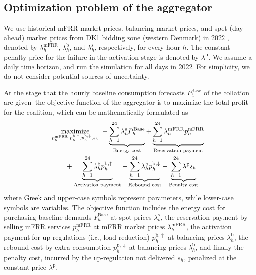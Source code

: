 \documentclass[conference]{IEEEtran}
\begin{document}
\subsection{Optimization problem of the aggregator}
We use historical mFRR market prices, balancing market prices, and spot (day-ahead) market prices from DK1 bidding zone (western Denmark) in 2022 \cite{energinet:energidataservice}, denoted by $\lambda_{h}^{\text{mFRR}}$, $\lambda_{h}^{\text{b}}$, and $\lambda_{h}^{\text{s}}$, respectively,  for every hour $h$. The constant penalty price for the failure in the activation stage is denoted by $\lambda^{\text{p}}$. We assume a daily time horizon, and run the simulation for all days in 2022. For simplicity, we do not consider potential sources of uncertainty.

At the stage that the hourly baseline consumption forecasts $P^{\text{Base}}_{h}$ of the collation are given, the objective function of the aggregator is to maximize the total profit for the coalition, which can be mathematically formulated as
%
\begin{align}\label{eq:mFRRObjective}
     & \underset{p^{\text{mFRR}}_{h}, p^{\text{b},\uparrow}_{h}, p^{\text{b},\downarrow}_{h}, s_{h}}{\rm{maximize}} \ - \underbrace{\sum_{h=1}^{24} \lambda^{\text{s}}_{h}P^{\text{Base}}_{h}}_{\textrm{Energy cost}} + \underbrace{\sum_{h=1}^{24}\lambda_{h}^{\text{mFRR}} p^{\text{mFRR}}_{h}}_{\textrm{Reservation payment}}  \notag \\ & \quad \quad + \underbrace{\sum_{h=1}^{24}  \lambda_{h}^{\text{b}} p^{\text{b},\uparrow}_{h}}_{\textrm{Activation payment}} - \underbrace{\sum_{h=1}^{24}  \lambda_{h}^{\text{b}} p^{\text{b},\downarrow}_{h}}_{\textrm{Rebound cost}} - \underbrace{ \sum_{h=1}^{24}  \lambda^{\text{p}}s_{h}}_{\textrm{Penalty cost}}
\end{align}
where Greek and upper-case symbols represent parameters, while lower-case symbols are variables. The objective function includes the energy cost for purchasing baseline demands $P^{\text{Base}}_{h}$ at spot prices $\lambda^{\text{s}}_{h}$, the reservation payment by selling mFRR services $p^{\text{mFRR}}_{h}$ at mFRR market prices $\lambda_{h}^{\text{mFRR}}$, the activation payment for up-regulations (i.e., load reduction) $p^{\text{b},\uparrow}_{h}$ at balancing prices $\lambda_{h}^{\text{b}}$, the rebound cost by extra consumption $p^{\text{b},\downarrow}_{h}$ at balancing prices $\lambda_{h}^{\text{b}}$, and finally the penalty cost, incurred by the up-regulation not delivered $s_{h}$, penalized at the constant price $\lambda^{\text{p}}$. %
\end{document}
